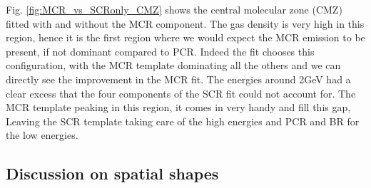 Fig. \ref{fig:MCR_vs_SCRonly_CMZ} shows the central molecular zone (CMZ) fitted with and without the MCR component. The gas density is very high in this region, hence it is the first region where we would expect the MCR emission to be present, if not dominant compared to PCR. Indeed the fit chooses this configuration, with the MCR template dominating all the others and we can directly see the improvement in the MCR fit. The energies around 2GeV had a clear excess that the four components of the SCR fit could not account for. The MCR template peaking in this region, it comes in very handy and fill this gap, Leaving the SCR template taking care of the high energies and PCR and BR for the low energies. 



\subsection{Discussion on spatial shapes}
